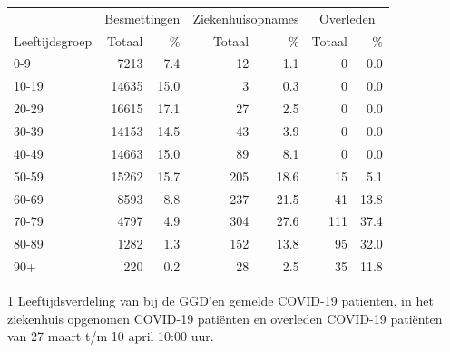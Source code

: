 \documentclass[
  english,
  man,floatsintext]{apa6}
\begin{document}
\begin{table}
\centering\begingroup\fontsize{11}{13}\selectfont

\begin{threeparttable}
\begin{tabular}{lrrrrrr}
\toprule
\multicolumn{1}{c}{ } & \multicolumn{2}{c}{Besmettingen} & \multicolumn{2}{c}{Ziekenhuisopnames} & \multicolumn{2}{c}{Overleden} \\
\cmidrule(l{3pt}r{3pt}){2-3} \cmidrule(l{3pt}r{3pt}){4-5} \cmidrule(l{3pt}r{3pt}){6-7}
Leeftijdsgroep & Totaal & \% & Totaal & \% & Totaal & \%\\
\midrule
0-9 & 7213 & 7.4 & 12 & 1.1 & 0 & 0.0\\
10-19 & 14635 & 15.0 & 3 & 0.3 & 0 & 0.0\\
20-29 & 16615 & 17.1 & 27 & 2.5 & 0 & 0.0\\
30-39 & 14153 & 14.5 & 43 & 3.9 & 0 & 0.0\\
40-49 & 14663 & 15.0 & 89 & 8.1 & 0 & 0.0\\
50-59 & 15262 & 15.7 & 205 & 18.6 & 15 & 5.1\\
60-69 & 8593 & 8.8 & 237 & 21.5 & 41 & 13.8\\
70-79 & 4797 & 4.9 & 304 & 27.6 & 111 & 37.4\\
80-89 & 1282 & 1.3 & 152 & 13.8 & 95 & 32.0\\
90+ & 220 & 0.2 & 28 & 2.5 & 35 & 11.8\\
\bottomrule
\end{tabular}
\begin{tablenotes}
\item[1] Leeftijdsverdeling van bij de GGD’en gemelde COVID-19 patiënten, in het ziekenhuis opgenomen COVID-19 patiënten en overleden COVID-19 patiënten van 27 maart t/m 10 april 10:00 uur.
\end{tablenotes}
\end{threeparttable}
\endgroup{}
\end{table}

\newpage
\end{document}
